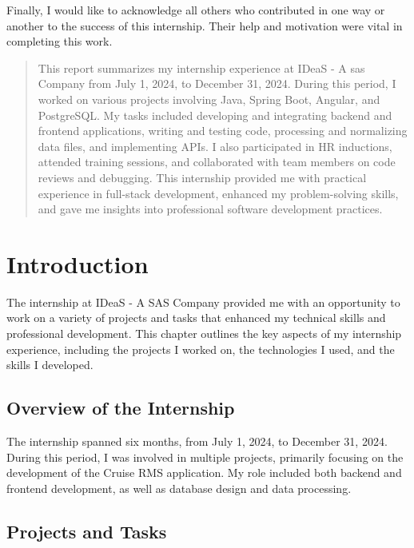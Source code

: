 \documentclass[openany, 11pt]{report} %
\begin{document}
Finally, I would like to acknowledge all others who contributed in one way or another to the success of this internship. Their help and motivation were vital in completing this work.\\

\begin{abstract}
    This report summarizes my internship experience at IDeaS - A sas Company from July 1, 2024, to December 31, 2024. During this period, I worked on various projects involving Java, Spring Boot, Angular, and PostgreSQL. My tasks included developing and integrating backend and frontend applications, writing and testing code, processing and normalizing data files, and implementing APIs. I also participated in HR inductions, attended training sessions, and collaborated with team members on code reviews and debugging. This internship provided me with practical experience in full-stack development, enhanced my problem-solving skills, and gave me insights into professional software development practices.
\end{abstract}

\setcounter{page}{1}

\chapter{Introduction}
The internship at IDeaS - A SAS Company provided me with an opportunity to work on a variety of projects and tasks that enhanced my technical skills and professional development. This chapter outlines the key aspects of my internship experience, including the projects I worked on, the technologies I used, and the skills I developed.

\section{Overview of the Internship}
The internship spanned six months, from July 1, 2024, to December 31, 2024. During this period, I was involved in multiple projects, primarily focusing on the development of the Cruise RMS application. My role included both backend and frontend development, as well as database design and data processing.

\section{Projects and Tasks}
\end{document}
